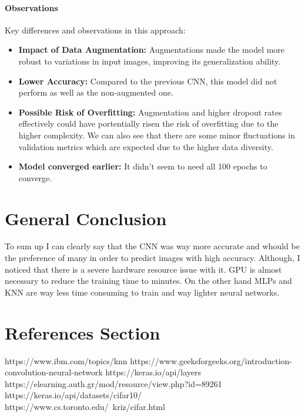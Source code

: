 \documentclass[lettersize,journal]{IEEEtran}
\begin{document}
\paragraph{\textbf{Observations}}

Key differences and observations in this approach:
\begin{itemize}
    \item \textbf{Impact of Data Augmentation:} Augmentations made the model more robust to variations in input images, improving its generalization ability.
    \item \textbf{Lower Accuracy:} Compared to the previous CNN, this model did not perform as well as the non-augmented one.
    \item \textbf{Possible Risk of Overfitting:} Augmentation and higher dropout rates effectively could have portentially risen the risk of overfitting due to the higher complexity. We can also see that there are some minor fluctuations in validation metrics which are expected due to the higher data diversity.
    \item \textbf{Model converged earlier:} It didn't seem to need all 100 epochs to converge.
\end{itemize}

\section{General Conclusion}
To sum up I can clearly say that the CNN was way more accurate and whould be the preference of many in order to predict images with high accuracy. Although, I noticed that there is a severe hardware resource issue with it. GPU is almost necessary to reduce the training time to minutes. On the other hand MLPs and KNN are way less time consuming to train and way lighter neural networks.

\section{References Section}
\begin{thebibliography}{1}

https://www.ibm.com/topics/knn
https://www.geeksforgeeks.org/introduction-convolution-neural-network
https://keras.io/api/layers
https://elearning.auth.gr/mod/resource/view.php?id=89261
https://keras.io/api/datasets/cifar10/
https://www.cs.toronto.edu/~kriz/cifar.html
\end{thebibliography}
\end{document}
